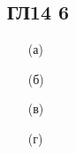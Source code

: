 \subsection*{ГЛ14 6}
\begin{enumerate}
\item[(а)] 
\item[(б)] 
\item[(в)] 
\item[(г)] 
\end{enumerate}
	
		